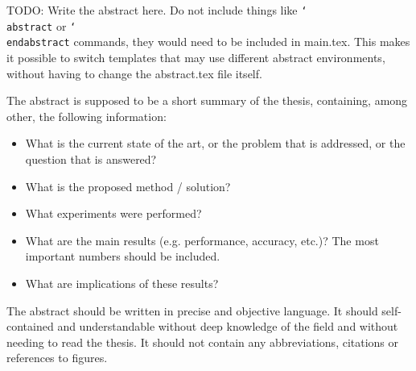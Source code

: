 TODO: Write the abstract here. Do not include things like \texttt{\char`\\abstract} or \texttt{\char`\\endabstract} commands, they would need to be included in main.tex.
This makes it possible to switch templates that may use different abstract environments, without having to change the abstract.tex file itself.

The abstract is supposed to be a short summary of the thesis, containing, among other, the following information:
\begin{itemize}
    \item What is the current state of the art, or the problem that is addressed, or the question that is answered?
    \item What is the proposed method / solution?
    \item What experiments were performed?
    \item What are the main results (e.g. performance, accuracy, etc.)? The most important numbers should be included.
    \item What are implications of these results?
\end{itemize}

The abstract should be written in precise and objective language.
It should self-contained and understandable without deep knowledge of the field and without needing to read the thesis.
It should not contain any abbreviations, citations or references to figures.
